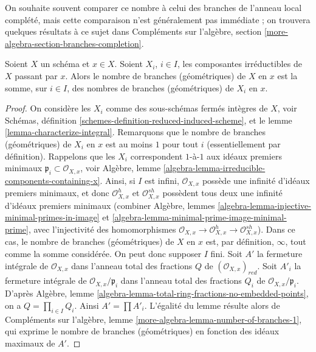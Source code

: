 \noindent
On souhaite souvent comparer ce nombre à celui des branches de l'anneau local
complété, mais cette comparaison n'est généralement pas immédiate ; on trouvera quelques résultats
à ce sujet dans Compléments sur l'algèbre, section
\ref{more-algebra-section-branches-completion}.

\begin{lemma}
\label{lemma-number-of-branches-irreducible-components}
Soient $X$ un schéma et $x \in X$. Soient $X_i$, $i \in I$, les
composantes irréductibles de $X$ passant par $x$.
Alors le nombre de branches (géométriques) de $X$ en $x$
est la somme, sur $i \in I$, des nombres de branches (géométriques)
de $X_i$ en $x$.
\end{lemma}

\begin{proof}
On considère les $X_i$ comme des sous-schémas fermés intègres de $X$, voir
Schémas, définition \ref{schemes-definition-reduced-induced-scheme}, et le
lemme \ref{lemma-characterize-integral}.
Remarquons que le nombre de branches (géométriques) de $X_i$ en $x$
est au moins $1$ pour tout $i$ (essentiellement par définition).
Rappelons que les $X_i$ correspondent $1$-à-$1$ aux idéaux premiers
minimaux $\mathfrak p_i \subset \mathcal{O}_{X, x}$, voir
Algèbre, lemme \ref{algebra-lemma-irreducible-components-containing-x}.
Ainsi, si $I$ est infini, $\mathcal{O}_{X, x}$ possède une infinité
d'idéaux premiers minimaux, et donc $\mathcal{O}_{X, x}^h$
et $\mathcal{O}_{X, x}^{sh}$ possèdent tous deux une infinité d'idéaux premiers
minimaux (combiner Algèbre, lemmes
\ref{algebra-lemma-injective-minimal-primes-in-image} et
\ref{algebra-lemma-minimal-prime-image-minimal-prime}, avec
l'injectivité des homomorphismes
$\mathcal{O}_{X, x} \to  \mathcal{O}_{X, x}^h \to \mathcal{O}_{X, x}^{sh}$).
Dans ce cas, le nombre de branches (géométriques) de $X$ en $x$
est, par définition, $\infty$, tout comme la somme considérée.
On peut donc supposer $I$ fini.
Soit $A'$ la fermeture intégrale de $\mathcal{O}_{X, x}$
dans l'anneau total des fractions $Q$ de $(\mathcal{O}_{X, x})_{red}$.
Soit $A'_i$ la fermeture intégrale de $\mathcal{O}_{X, x}/\mathfrak p_i$
dans l'anneau total des fractions $Q_i$ de $\mathcal{O}_{X, x}/\mathfrak p_i$.
D'après Algèbre, lemme \ref{algebra-lemma-total-ring-fractions-no-embedded-points},
on a $Q = \prod_{i \in I} Q_i$. Ainsi $A' = \prod A'_i$.
L'égalité du lemme résulte alors de
Compléments sur l'algèbre, lemme \ref{more-algebra-lemma-number-of-branches-1},
qui exprime le nombre de branches (géométriques) en fonction
des idéaux maximaux de $A'$.
\end{proof}

